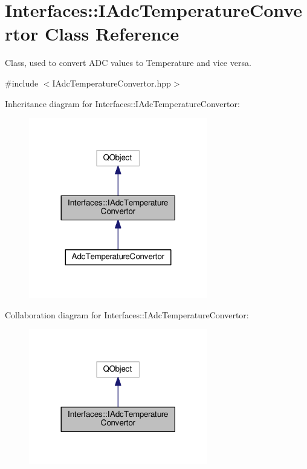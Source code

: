\hypertarget{class_interfaces_1_1_i_adc_temperature_convertor}{}\section{Interfaces\+:\+:I\+Adc\+Temperature\+Convertor Class Reference}
\label{class_interfaces_1_1_i_adc_temperature_convertor}


Class, used to convert A\+DC values to Temperature and vice versa.  




{\ttfamily \#include $<$I\+Adc\+Temperature\+Convertor.\+hpp$>$}



Inheritance diagram for Interfaces\+:\+:I\+Adc\+Temperature\+Convertor\+:\nopagebreak
\begin{figure}[H]
\begin{center}
\leavevmode
\includegraphics[width=221pt]{class_interfaces_1_1_i_adc_temperature_convertor__inherit__graph}
\end{center}
\end{figure}


Collaboration diagram for Interfaces\+:\+:I\+Adc\+Temperature\+Convertor\+:\nopagebreak
\begin{figure}[H]
\begin{center}
\leavevmode
\includegraphics[width=221pt]{class_interfaces_1_1_i_adc_temperature_convertor__coll__graph}
\end{center}
\end{figure}
